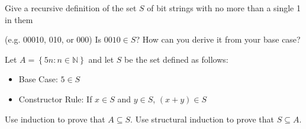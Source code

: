 \documentclass[solution, letterpaper]{cs20}
\begin{document}
\subproblem Give a recursive definition of the set $S$ of bit strings with no more than a single 1 in them 

(e.g. 00010, 010, or 000)
\subproblem Is $0010\in S$? How can you derive it from your base case?

Let $A = \left\{ {5n:n\in\mathbb{N}}\right\}$ and let $S$ be the set defined as follows:
\begin{itemize}
\item Base Case: $5 \in S$
\item Constructor Rule: If $x\in S$ and $y\in S$, $(x+y) \in S$ 
\end{itemize}
\subproblem Use induction to prove that $A\subseteq S $.
\subproblem Use structural induction to prove that $S\subseteq A$.
\end{document}

